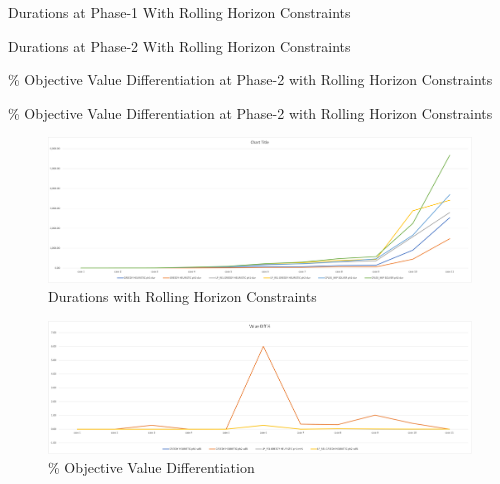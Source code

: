 \documentclass[11pt]{article}
\begin{document}
{\begin{landscape}
        \begin{table}[htb]
                \centering
                \caption[Short Caption for LoT]{Durations at Phase-1 With Rolling Horizon Constraints}\label{table:tbl_test_durations_with_rh_ph1}
        \end{table}
        \begin{table}[htb]
                \centering
                \caption[Short Caption for LoT]{Durations at Phase-2 With Rolling Horizon Constraints}\label{table:tbl_test_durations_with_rh_ph2}
        \end{table}
        \begin{table}[htb]
                \centering
                \caption[Short Caption for LoT]{\% Objective Value Differentiation at Phase-2 with Rolling Horizon Constraints}\label{table:tbl_test_obj_diff_with_rh_ph1}
        \end{table}
        \begin{table}[htb]
                \centering
                \caption[Short Caption for LoT]{\% Objective Value Differentiation at Phase-2 with Rolling Horizon Constraints}\label{table:tbl_test_obj_diff_with_rh_ph2}
        \end{table}
\newpage
        \begin{figure}[htp]
            \centering
            \includegraphics[width=20cm]{durations_with_rh}
            \caption{Durations with Rolling Horizon Constraints}
            \label{fig:fig_durations_with_rh}
        \end{figure}

        \begin{figure}[htp]
            \centering
            \includegraphics[width=20cm]{value_diff_with_rh}
            \caption{\% Objective Value Differentiation}
            \label{fig:fig_durations_with_rh}
        \end{figure}
    \end{landscape}
    \clearpage%
}
\end{document}
